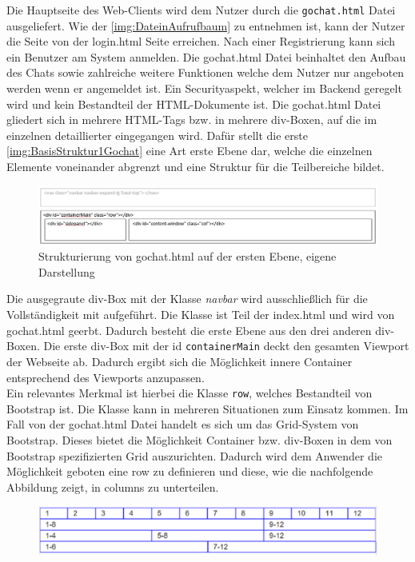 \documentclass[a4paper,titlepage,halfparskip,12pt]{scrreprt}
\begin{document}
\begin{onehalfspacing}
Die Hauptseite des Web-Clients wird dem Nutzer durch die \texttt{gochat.html} Datei ausgeliefert. Wie der \autoref{img:DateinAufrufbaum} zu entnehmen ist, kann der Nutzer die Seite von der login.html Seite erreichen. Nach einer Registrierung kann sich ein Benutzer am System anmelden. Die gochat.html Datei beinhaltet den Aufbau des Chats sowie zahlreiche weitere Funktionen welche dem Nutzer nur angeboten werden wenn er angemeldet ist. Ein Securityaspekt, welcher im Backend geregelt wird und kein Bestandteil der HTML-Dokumente ist. Die gochat.html Datei gliedert sich in mehrere HTML-Tags bzw. in mehrere div-Boxen, auf die im einzelnen detaillierter eingegangen wird. Dafür stellt die erste \autoref{img:BasisStruktur1Gochat} eine Art erste Ebene dar, welche die einzelnen Elemente voneinander abgrenzt und eine Struktur für die Teilbereiche bildet.
\begin{figure}[h]
	\centering
	\includegraphics[width=\linewidth]{images/BasisStruktur1Gochat}
	\caption{Strukturierung von gochat.html auf der ersten Ebene, eigene Darstellung}
	\label{img:BasisStruktur1Gochat}
\end{figure}
Die ausgegraute div-Box mit der Klasse \textit{navbar} wird ausschließlich für die Vollständigkeit mit aufgeführt. Die Klasse ist Teil der index.html und wird von gochat.html geerbt. Dadurch besteht die erste Ebene aus den drei anderen div-Boxen. Die erste div-Box mit der id \texttt{containerMain} deckt den gesamten Viewport der Webseite ab. Dadurch ergibt sich die Möglichkeit innere Container entsprechend des Viewports anzupassen.\\
Ein relevantes Merkmal ist hierbei die Klasse \texttt{row}, welches Bestandteil von Bootstrap ist. Die Klasse kann in mehreren Situationen zum Einsatz kommen. Im Fall von der gochat.html Datei handelt es sich um das Grid-System von Bootstrap. Dieses bietet die Möglichkeit Container bzw. div-Boxen in dem von Bootstrap spezifizierten Grid auszurichten. Dadurch wird dem Anwender die Möglichkeit geboten eine row zu definieren und diese, wie die nachfolgende Abbildung zeigt, in columns zu unterteilen.
\begin{figure}[h]
	\centering
	\includegraphics[scale=0.9]{images/GridSystem}

\end{figure}
\end{onehalfspacing}
\end{document}
